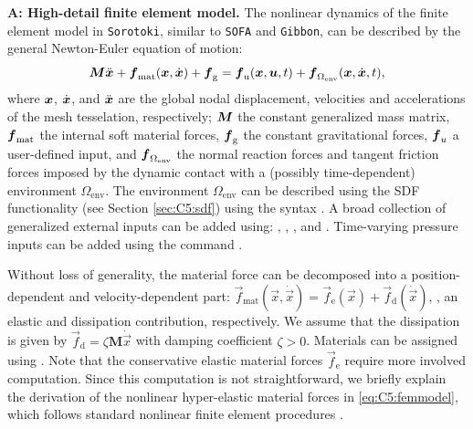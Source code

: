 \textbf{A: High-detail finite element model.} The nonlinear dynamics of the finite element model in \texttt{Sorotoki}, similar to \texttt{SOFA} and \texttt{Gibbon}, can be described by the general Newton-Euler equation of motion:
%
\begin{equation}
    {\boldsymbol{M}} {\ddot{\boldsymbol{x}}} + {\boldsymbol{f}}_\textrm{mat}({\boldsymbol{x}},{\dot{\boldsymbol{x}}}) + {\boldsymbol{f}}_{\scriptstyle\textrm{g}} = {\boldsymbol{f}}_{\textrm{u}}({\boldsymbol{x}},{\boldsymbol{u}},t) + {\boldsymbol{f}}_{\Omega_{\textrm{env}}}({\boldsymbol{x}},{\dot{\boldsymbol{x}}},t),
    \label{eq:C5:femmodel}
\end{equation}
%
where ${\boldsymbol{x}}$, ${\dot{\boldsymbol{x}}}$, and ${\ddot{\boldsymbol{x}}}$ are the global nodal displacement, velocities and accelerations of the mesh tesselation, respectively; ${\boldsymbol{M}}$ the constant generalized mass matrix, ${\boldsymbol{f}}_\textrm{mat}$ the internal soft material forces, ${\boldsymbol{f}}_\textrm{g}$ the constant gravitational forces, ${\boldsymbol{f}}_u$ a user-defined input, and ${\boldsymbol{f}}_{\Omega_{\textrm{env}}}$ the normal reaction forces and tangent friction forces imposed by the dynamic contact with a (possibly time-dependent) environment $\Omega_{\textrm{env}}$. The environment $\Omega_{\textrm{env}}$ can be described using the SDF functionality (see Section \ref{sec:C5:sdf}) using the syntax . A broad collection of generalized external inputs can be added using: , , , and . Time-varying pressure inputs can be added using the command . 

Without loss of generality, the material force can be decomposed into a position-dependent and velocity-dependent part: $\vec{f}_{\textrm{mat}}(\vec{x},\dot{\vec{x}}) = \vec{f}_{\textrm{e}}(\vec{x}) + \vec{f}_{\textrm{d}}(\dot{\vec{x}})$, \ie, an elastic and dissipation contribution, respectively. We assume that the dissipation is given by $\vec{f}_{\textrm{d}} = \zeta \mathbf{M} \dot{\vec{x}}$ with damping coefficient $\zeta > 0$. Materials can be assigned using . Note that the conservative elastic material forces $\vec{f}_{\textrm{e}}$ require more involved computation. Since this computation is not straightforward, we briefly explain the derivation of the nonlinear hyper-elastic material forces in \eqref{eq:C5:femmodel}, which follows standard nonlinear finite element procedures \cite{Kim2018,Holzapfel2002,Smith2018}. \\

